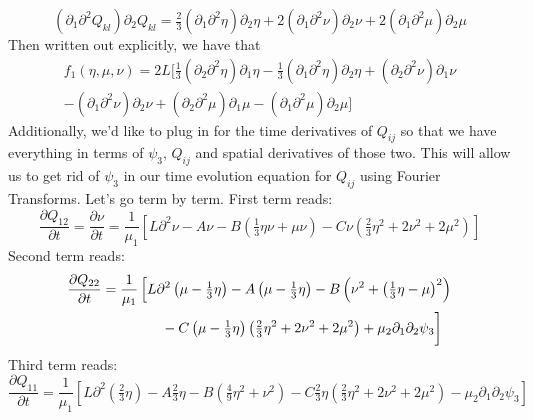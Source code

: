 \documentclass[reqno]{article}
\begin{document}
	\begin{equation}
		\left( \partial_1\partial^2 Q_{kl}\right)\partial_2 Q_{kl} = \tfrac23\left( \partial_1\partial^2 \eta \right)\partial_2\eta + 2\left( \partial_1\partial^2\nu \right)\partial_2 \nu + 2\left( \partial_1\partial^2 \mu \right)\partial_2\mu
	\end{equation}
	Then written out explicitly, we have that
	\begin{multline}\label{eq:f1}
		f_1(\eta, \mu, \nu) = 2L \bigg[ \tfrac13 \left( \partial_2\partial^2 \eta \right) \partial_1 \eta - \tfrac13 \left( \partial_1\partial^2 \eta\right)\partial_2 \eta + \left(\partial_2 \partial^2 \nu\right)\partial_1 \nu \\ - \left(\partial_1 \partial^2 \nu\right)\partial_2 \nu + \left(\partial_2 \partial^2 \mu\right)\partial_1 \mu - \left(\partial_1 \partial^2 \mu\right)\partial_2 \mu \bigg]
	\end{multline}
	Additionally, we'd like to plug in for the time derivatives of $Q_{ij}$ so that we have everything in terms of $\psi_3$, $Q_{ij}$ and spatial derivatives of those two. This will allow us to get rid of $\psi_3$ in our time evolution equation for $Q_{ij}$ using Fourier Transforms.  Let's go term by term. First term reads:
	\begin{equation}
		\frac{\partial Q_{12}}{\partial t} = \frac{\partial \nu}{\partial t} = \frac{1}{\mu_1} \left[ L\partial^2 \nu - A\nu - B\left(\tfrac{1}{3}\eta\nu + \mu\nu\right) - C\nu\left( \tfrac{2}{3}\eta^2 + 2\nu^2 + 2\mu^2 \right) \right]
	\end{equation}
	Second term reads:
	\begin{equation}
	\begin{split}
		\frac{\partial Q_{22}}{\partial t} &= \frac{1}{\mu_1}\left[ L\partial^2 \left( \mu - \tfrac{1}{3}\eta \right) - A\left( \mu - \tfrac{1}{3}\eta \right) - B\left( \nu^2 + 
		\left( \tfrac{1}{3}\eta - \mu \right)^2 \right)\right. \\
		&\qquad\qquad\left.\vphantom{\frac13^2}- C\left( \mu - \tfrac{1}{3}\eta \right)\left( \tfrac{2}{3}\eta^2 + 2\nu^2 + 2\mu^2 \right) + \mu_2 \partial_1\partial_2 \psi_3 \right]
	\end{split}
	\end{equation}
	Third term reads:
	\begin{equation}
		\frac{\partial Q_{11}}{\partial t} = \frac{1}{\mu_1} \left[L\partial^2 \left( \tfrac{2}{3}\eta \right) - A \tfrac{2}{3}\eta - B\left( \tfrac{4}{9}\eta^2 + \nu^2 \right) - C \tfrac{2}{3}\eta \left( \tfrac{2}{3}\eta^2 + 2\nu^2 + 2\mu^2 \right) - \mu_2 \partial_1\partial_2 \psi_3 \right]
	\end{equation}
\end{document}
